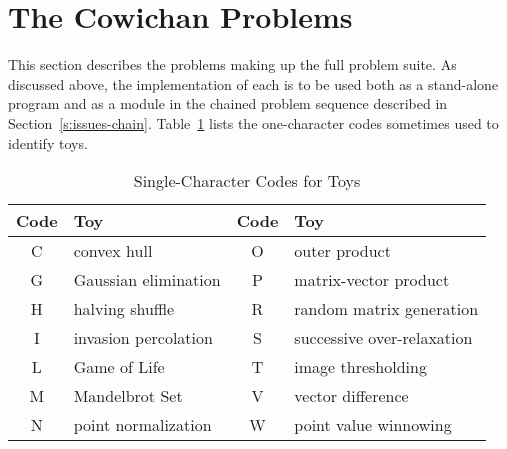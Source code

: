 \section{The Cowichan Problems\label{s:toys}}

This section describes the problems making up the full problem suite.
As discussed above,
the implementation of each is to be used both as a stand-alone program
and as a module in the chained problem sequence described in Section~\ref{s:issues-chain}.
Table~\ref{t:toy-codes} lists the one-character codes sometimes used to identify toys.

\begin{table}
\begin{center}
\begin{tabular}{cl|cl}
Code	& Toy				& Code	& Toy				\\
\hline
C	& convex hull			& O	& outer product			\\
G	& Gaussian elimination		& P	& matrix-vector product		\\
H	& halving shuffle		& R	& random matrix generation	\\
I	& invasion percolation		& S	& successive over-relaxation	\\
L	& Game of Life			& T	& image thresholding		\\
M	& Mandelbrot Set		& V	& vector difference		\\
N	& point normalization		& W	& point value winnowing
\end{tabular}
\caption{Single-Character Codes for Toys\label{t:toy-codes}}
\end{center}
\end{table}















